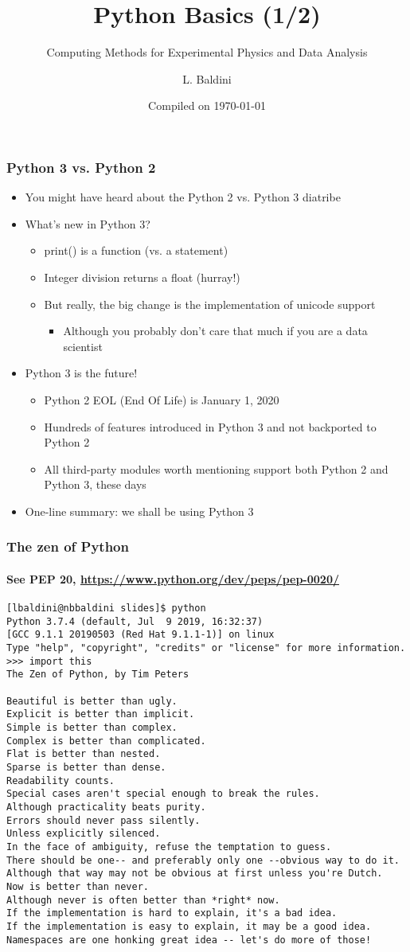 \documentclass[9pt]{beamer}
\title{Python Basics (1/2)}
\subtitle{Computing Methods for Experimental Physics and Data Analysis}
\date{Compiled on \today}
\author{L. Baldini}
\institute[UNIPI and INFN]{Universit\`a and INFN--Pisa}
\begin{document}
\titleframe

\begin{frame}
  \frametitle{Python 3 vs. Python 2}
  \begin{itemize}
  \item You might have heard about the Python 2 vs. Python 3 diatribe
  \item What's new in Python 3?
    \begin{itemize}
    \item print() is a function (vs. a statement)
    \item Integer division returns a float (hurray!)
    \item But really, \alert{the big change is the implementation of
      unicode support}
      \begin{itemize}
      \item Although you probably don't care that much if you are a data
        scientist
      \end{itemize}
    \end{itemize}
  \item Python 3 is the future!
    \begin{itemize}
    \item Python 2 EOL (End Of Life) is January 1, 2020
    \item Hundreds of features introduced in Python 3 and not backported to
      Python 2
    \item All third-party modules worth mentioning support both Python 2 and
      Python 3, these days
    \end{itemize}
  \item \alert{One-line summary: we shall be using Python 3}
  \end{itemize}
\end{frame}


\begin{frame}[fragile]
  \frametitle{The zen of Python}
  \framesubtitle{See PEP 20, \url{https://www.python.org/dev/peps/pep-0020/}}
  \begin{Verbatim}
[lbaldini@nbbaldini slides]$ python
Python 3.7.4 (default, Jul  9 2019, 16:32:37) 
[GCC 9.1.1 20190503 (Red Hat 9.1.1-1)] on linux
Type "help", "copyright", "credits" or "license" for more information.
>>> import this
The Zen of Python, by Tim Peters

Beautiful is better than ugly.
Explicit is better than implicit.
Simple is better than complex.
Complex is better than complicated.
Flat is better than nested.
Sparse is better than dense.
Readability counts.
Special cases aren't special enough to break the rules.
Although practicality beats purity.
Errors should never pass silently.
Unless explicitly silenced.
In the face of ambiguity, refuse the temptation to guess.
There should be one-- and preferably only one --obvious way to do it.
Although that way may not be obvious at first unless you're Dutch.
Now is better than never.
Although never is often better than *right* now.
If the implementation is hard to explain, it's a bad idea.
If the implementation is easy to explain, it may be a good idea.
Namespaces are one honking great idea -- let's do more of those!
  \end{Verbatim}
\end{frame}
\end{document}
